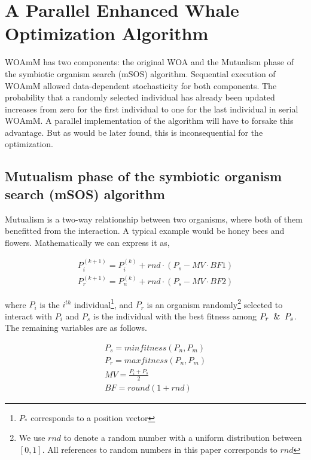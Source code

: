 \documentclass[conference]{IEEEtran}
\begin{document}
\section{A Parallel Enhanced Whale Optimization Algorithm}

WOAmM has two components: 
the original WOA and the Mutualism phase of the symbiotic organism search (mSOS) algorithm. 
Sequential execution of WOAmM allowed data-dependent stochasticity for both components. 
The probability that a randomly selected individual has already been updated increases from zero for the first individual to one for the last individual in serial WOAmM. 
A parallel implementation of the algorithm will have to forsake this advantage. 
But as would be later found, this is inconsequential for the optimization.

\subsection{Mutualism phase of the symbiotic organism search (mSOS) algorithm}

Mutualism is a two-way relationship between two organisms, where both of them benefitted from the interaction. 
A typical example would be honey bees and flowers. 
Mathematically we can express it as,

\setlength{\arraycolsep}{0.0em}
\begin{eqnarray}
    P^{(k+1)}_i= P^{(k)}_i+rnd\cdot(P_s - MV\cdot BF1)\\
    P^{(k+1)}_r= P^{(k)}_n+rnd\cdot(P_s - MV\cdot BF2)
\end{eqnarray}
\setlength{\arraycolsep}{0pt}

where $P_i$ is the $i^{th}$ individual\footnote{$P_*$ corresponds to a position vector}, and $P_r$ is an organism randomly\footnote{We use $rnd$ to denote a random number with a uniform distribution between $[0, 1]$. All references to random numbers in this paper corresponds to $rnd$} selected to interact with $P_i$ and $P_s$ is the individual with the best fitness among $P_r \And P_s$. 
The remaining variables are as follows.

\setlength{\arraycolsep}{0em}
\begin{eqnarray}
    P_s=min fitness(P_n,P_m) \\
    P_r=max fitness(P_n,P_m) \\
    MV = \frac{P_i+P_s}{2} \\
    BF = round(1+rnd)
\end{eqnarray}
\setlength{\arraycolsep}{0pt}
\end{document}
